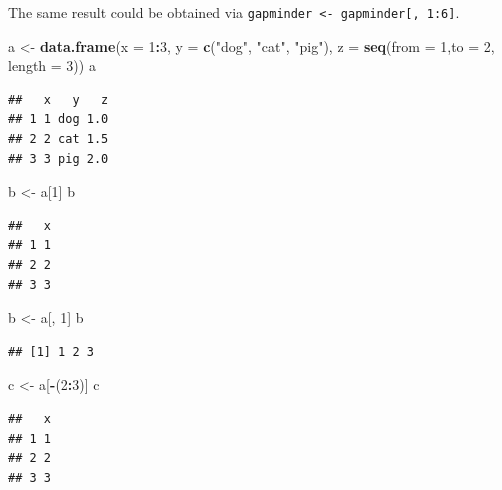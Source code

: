 \documentclass[]{article}
\newenvironment{Shaded}{\begin{snugshade}}{\end{snugshade}}
\newcommand{\KeywordTok}[1]{\textcolor[rgb]{0.13,0.29,0.53}{\textbf{#1}}}
\newcommand{\DataTypeTok}[1]{\textcolor[rgb]{0.13,0.29,0.53}{#1}}
\newcommand{\DecValTok}[1]{\textcolor[rgb]{0.00,0.00,0.81}{#1}}
\newcommand{\StringTok}[1]{\textcolor[rgb]{0.31,0.60,0.02}{#1}}
\newcommand{\OperatorTok}[1]{\textcolor[rgb]{0.81,0.36,0.00}{\textbf{#1}}}
\newcommand{\NormalTok}[1]{#1}
\begin{document}
The same result could be obtained via
\texttt{gapminder\ \textless{}-\ gapminder{[},\ 1:6{]}}.

\begin{Shaded}
\begin{Highlighting}[]
\NormalTok{a <-}\StringTok{ }\KeywordTok{data.frame}\NormalTok{(}\DataTypeTok{x =} \DecValTok{1}\OperatorTok{:}\DecValTok{3}\NormalTok{, }\DataTypeTok{y =} \KeywordTok{c}\NormalTok{(}\StringTok{"dog"}\NormalTok{, }\StringTok{"cat"}\NormalTok{, }\StringTok{"pig"}\NormalTok{), }\DataTypeTok{z =} \KeywordTok{seq}\NormalTok{(}\DataTypeTok{from =} \DecValTok{1}\NormalTok{,}\DataTypeTok{to =} \DecValTok{2}\NormalTok{, }\DataTypeTok{length =} \DecValTok{3}\NormalTok{))}
\NormalTok{a}
\end{Highlighting}
\end{Shaded}

\begin{verbatim}
##   x   y   z
## 1 1 dog 1.0
## 2 2 cat 1.5
## 3 3 pig 2.0
\end{verbatim}

\begin{Shaded}
\begin{Highlighting}[]
\NormalTok{b <-}\StringTok{ }\NormalTok{a[}\DecValTok{1}\NormalTok{]}
\NormalTok{b}
\end{Highlighting}
\end{Shaded}

\begin{verbatim}
##   x
## 1 1
## 2 2
## 3 3
\end{verbatim}

\begin{Shaded}
\begin{Highlighting}[]
\NormalTok{b <-}\StringTok{ }\NormalTok{a[, }\DecValTok{1}\NormalTok{]}
\NormalTok{b}
\end{Highlighting}
\end{Shaded}

\begin{verbatim}
## [1] 1 2 3
\end{verbatim}

\begin{Shaded}
\begin{Highlighting}[]
\NormalTok{c <-}\StringTok{ }\NormalTok{a[}\OperatorTok{-}\NormalTok{(}\DecValTok{2}\OperatorTok{:}\DecValTok{3}\NormalTok{)]}
\NormalTok{c}
\end{Highlighting}
\end{Shaded}

\begin{verbatim}
##   x
## 1 1
## 2 2
## 3 3
\end{verbatim}
\end{document}
